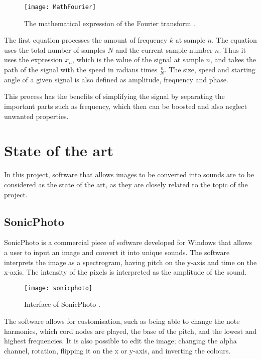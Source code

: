 \begin{figure}[!h]
\centering
\texttt{[image: MathFourier]}
\caption{The mathematical expression of the Fourier transform \cite{MathFourier2013}.}
\end{figure}

The first equation processes the amount of frequency \(k\) at sample \(n\). The equation uses the total number of samples \(N\) and the current sample number \(n\). Thus it uses the expression \(x_n\), which is the value of the signal at sample \(n\), and takes the path of the signal with the speed in radians times \(\frac{n}{N}\). The size, speed and starting angle of a given signal is also defined as amplitude, frequency and phase.      

This process has the benefits of simplifying the signal by separating the important parts such as frequency, which then can be boosted and also neglect unwanted properties.       

\section{State of the art}\label{sec:stateart}
In this project, software that allows images to be converted into sounds are to be considered as the state of the art, as they are closely related to the topic of the project.

\subsection{SonicPhoto}\label{sub:sonic}
SonicPhoto \cite{White2013} is a commercial piece of software developed for Windows that allows a user to input an image and convert it into unique sounds. The software interprets the image as a spectrogram, having pitch on the y-axis and time on the x-axis. The intensity of the pixels is interpreted as the amplitude of the sound. 

\begin{figure}[!h] 
\centering
\texttt{[image: sonicphoto]}
\caption{\label{fig:sonicphoto} Interface of SonicPhoto \cite{White2013}.}
\end{figure}

The software allows for customisation, such as being able to change the note harmonics, which cord nodes are played, the base of the pitch, and the lowest and highest frequencies. It is also possible to edit the image; changing the alpha channel, rotation, flipping it on the x or y-axis, and inverting the colours. 

